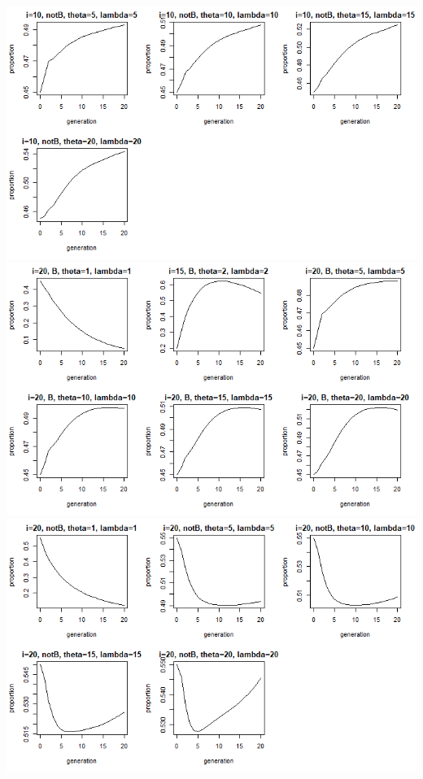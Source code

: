 \documentclass[a4paper,8pt]{extarticle}
\begin{document}
\\
\includegraphics[scale = 0.6]{00006f.png}
\\
\includegraphics[scale = 0.6]{00002b.png}
\\
\includegraphics[scale = 0.6]{000017.png}
\\
\end{document}
